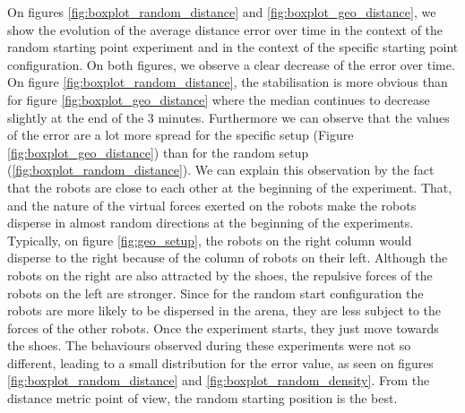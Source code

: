\documentclass[oneside, a4paper, 12pt]{memoir}
\begin{document}
					On figures \ref{fig:boxplot_random_distance} and \ref{fig:boxplot_geo_distance}, we show the evolution of the average distance error over time in the context of the random starting point experiment and in the context of the specific starting point configuration. On both figures, we observe a clear decrease of the error over time. On figure \ref{fig:boxplot_random_distance}, the stabilisation is more obvious than for figure \ref{fig:boxplot_geo_distance} where the median continues to decrease slightly at the end of the 3 minutes. Furthermore we can observe that the values of the error are a lot more spread for the specific setup (Figure \ref{fig:boxplot_geo_distance}) than for the random setup (\ref{fig:boxplot_random_distance}). We can explain this observation by the fact that the robots are close to each other at the beginning of the experiment. That, and the nature of the virtual forces exerted on the robots make the robots disperse in almost random directions at the beginning of the experiments. Typically, on figure \ref{fig:geo_setup}, the robots on the right column would disperse to the right because of the column of robots on their left. Although the robots on the right are also attracted by the shoes, the repulsive forces of the robots on the left are stronger. Since for the random start configuration the robots are more likely to be dispersed in the arena, they are less subject to the forces of the other robots. Once the experiment starts, they just move towards the shoes. The behaviours observed during these experiments were not so different, leading to a small distribution for the error value, as seen on figures \ref{fig:boxplot_random_distance} and \ref{fig:boxplot_random_density}. From the distance metric point of view, the random starting position is the best.
			
\end{document}
